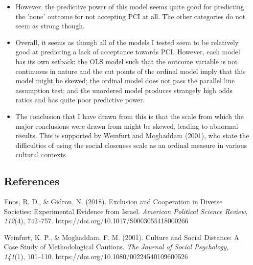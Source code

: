\documentclass[12pt,letterpaper]{article}
\begin{document}
\begin{itemize}
	\item However, the predictive power of this model seems quite good for predicting the 'none' outcome for not accepting PCI at all. The other categories do not seem as strong though. 
	\item Overall, it seems as though all of the models I tested seem to be relatively good at predicting a lack of acceptance towards PCI. However, each model has its own setback: the OLS model such that the outcome variable is not continuous in nature and the cut points of the ordinal model imply that this model might be skewed; the ordinal model does not pass the parallel line assumption test; and the unordered model produces strangely high odds ratios and has quite poor predictive power. 
	\item The conclusion that I have drawn from this is that the scale from which the major conclusions were drawn from might be skewed, leading to abnormal results. This is supported by Weinfurt and Moghaddam (2001), who state the difficulties of using the social closeness scale as an ordinal measure in various cultural contexts
\end{itemize}

\subsection{References}
\begin{list}{}{\setlength{\leftmargin}{2.5em}\setlength{\itemindent}{-2.5em}}
	\item[] Enos, R. D., \& Gidron, N. (2018). Exclusion and Cooperation in Diverse Societies: Experimental Evidence from Israel. \textit{American Political Science Review}, \textit{112}(4), 742–757. https://doi.org/10.1017/S0003055418000266
	\item[] Weinfurt, K. P., \& Moghaddam, F. M. (2001). Culture and Social Distance: A Case Study of Methodological Cautions. \textit{The Journal of Social Psychology}, \textit{141}(1), 101–110. https://doi.org/10.1080/00224540109600526
\end{list}
\end{document}
